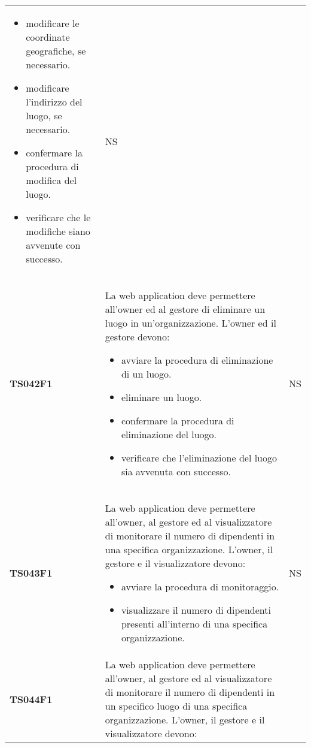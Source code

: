 \documentclass[../piano-di-qualifica.tex]{subfiles}
\begin{document}
\begin{centering}
\begin{longtable}[H]{>{\centering\bfseries}m{3cm} >{}p{10cm} >{\centering\arraybackslash}m{3cm}}
\begin{itemize}
                        \item modificare le coordinate geografiche, se necessario.
                        \item modificare l'indirizzo del luogo, se necessario.
                        \item confermare la procedura di modifica del luogo.
                        \item verificare che le modifiche siano avvenute con successo.
                      \end{itemize}
                    & NS \\
        TS042F1     & La web application deve permettere all'owner ed al gestore di eliminare un luogo in un'organizzazione. \newline
                      L'owner ed il gestore devono:
                      \begin{itemize}
                        \item avviare la procedura di eliminazione di un luogo.
                        \item eliminare un luogo.
                        \item confermare la procedura di eliminazione del luogo.
                        \item verificare che l'eliminazione del luogo sia avvenuta con successo.
                      \end{itemize}
                    & NS \\
        TS043F1     & La web application deve permettere all'owner, al gestore ed al visualizzatore di monitorare il numero di dipendenti in una specifica organizzazione. \newline
                      L'owner, il gestore e il visualizzatore devono:
                      \begin{itemize}
                        \item avviare la procedura di monitoraggio.
                        \item visualizzare il numero di dipendenti presenti all'interno di una specifica organizzazione.
                      \end{itemize}
                    & NS \\
        TS044F1     & La web application deve permettere all'owner, al gestore ed al visualizzatore di monitorare il numero di dipendenti in un specifico luogo di una specifica organizzazione. \newline
                      L'owner, il gestore e il visualizzatore devono:

\end{longtable}
\end{centering}
\end{document}

